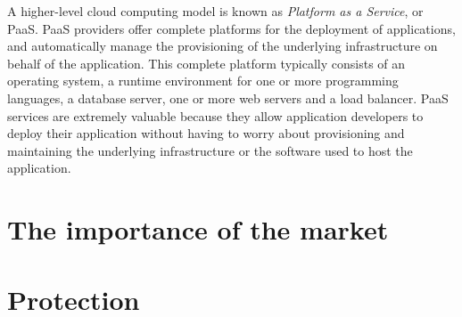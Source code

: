 \documentclass[a4paper]{proc}
\begin{document}
  A higher-level cloud computing model is known as \emph{Platform as a Service}, or PaaS. PaaS providers offer complete platforms for the deployment of applications, and automatically manage the provisioning of the underlying infrastructure on behalf of the application. This complete platform typically consists of an operating system, a runtime environment for one or more programming languages, a database server, one or more web servers and a load balancer. PaaS services are extremely valuable because they allow application developers to deploy their application without having to worry about provisioning and maintaining the underlying infrastructure or the software used to host the application.




  \section{The importance of the market}


  \section{Protection}

\end{document}
